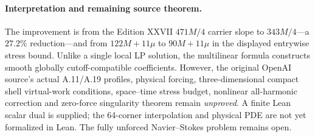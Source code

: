 \paragraph{Interpretation and remaining source theorem.}
The improvement is from the Edition XXVII $471M/4$
carrier slope to $343M/4$---a $27.2\%$ reduction---and
from $122M+11\mu$ to $90M+11\mu$ in the displayed
entrywise stress bound. Unlike a single local LP solution,
the multilinear formula constructs smooth globally
cutoff-compatible coefficients. However, the original
OpenAI source's actual A.11/A.19 profiles, physical forcing,
three-dimensional compact shell virtual-work conditions,
space--time stress budget, nonlinear all-harmonic correction
and zero-force singularity theorem remain \emph{unproved}.
A finite Lean scalar dual is supplied; the 64-corner
interpolation and physical PDE are not yet formalized in
Lean. The fully unforced Navier--Stokes problem remains open.


